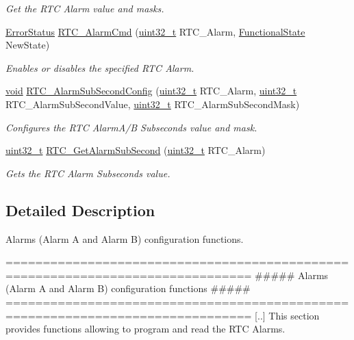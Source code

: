 \begin{DoxyCompactItemize}
\begin{DoxyCompactList}\small\item\em Get the R\-T\-C Alarm value and masks. \end{DoxyCompactList}\item 
\hyperlink{group___exported__types_ga8333b96c67f83cba354b3407fcbb6ee8}{Error\-Status} \hyperlink{group___r_t_c___group3_gac2c08f1aeeb664d3d245cb5aca1b8ca8}{R\-T\-C\-\_\-\-Alarm\-Cmd} (\hyperlink{stdint_8h_a435d1572bf3f880d55459d9805097f62}{uint32\-\_\-t} R\-T\-C\-\_\-\-Alarm, \hyperlink{group___exported__types_gac9a7e9a35d2513ec15c3b537aaa4fba1}{Functional\-State} New\-State)
\begin{DoxyCompactList}\small\item\em Enables or disables the specified R\-T\-C Alarm. \end{DoxyCompactList}\item 
\hyperlink{group___n_a_m_e_ga18028b8badbf1ea7e704ccac3c488e82}{void} \hyperlink{group___r_t_c___group3_ga7b3e4e9e39262e9b0d1aadd895394e46}{R\-T\-C\-\_\-\-Alarm\-Sub\-Second\-Config} (\hyperlink{stdint_8h_a435d1572bf3f880d55459d9805097f62}{uint32\-\_\-t} R\-T\-C\-\_\-\-Alarm, \hyperlink{stdint_8h_a435d1572bf3f880d55459d9805097f62}{uint32\-\_\-t} R\-T\-C\-\_\-\-Alarm\-Sub\-Second\-Value, \hyperlink{stdint_8h_a435d1572bf3f880d55459d9805097f62}{uint32\-\_\-t} R\-T\-C\-\_\-\-Alarm\-Sub\-Second\-Mask)
\begin{DoxyCompactList}\small\item\em Configures the R\-T\-C Alarm\-A/\-B Subseconds value and mask. \end{DoxyCompactList}\item 
\hyperlink{stdint_8h_a435d1572bf3f880d55459d9805097f62}{uint32\-\_\-t} \hyperlink{group___r_t_c___group3_gae7b5e7146be2710d619c8ed3cca464ad}{R\-T\-C\-\_\-\-Get\-Alarm\-Sub\-Second} (\hyperlink{stdint_8h_a435d1572bf3f880d55459d9805097f62}{uint32\-\_\-t} R\-T\-C\-\_\-\-Alarm)
\begin{DoxyCompactList}\small\item\em Gets the R\-T\-C Alarm Subseconds value. \end{DoxyCompactList}\end{DoxyCompactItemize}


\subsection{Detailed Description}
Alarms (Alarm A and Alarm B) configuration functions. \begin{DoxyVerb} ===============================================================================
        ##### Alarms (Alarm A and Alarm B) configuration functions #####
 ===============================================================================  
    [..] This section provides functions allowing to program and read the RTC Alarms.\end{DoxyVerb}


